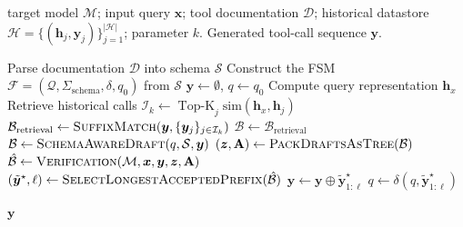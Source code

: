 \begin{algorithm}[tb]
\caption{Tool-calling with \method}
\label{alg:toolspec}
\small
\begin{algorithmic}[1]
\Require target model $\mathcal{M}$; input query $\boldsymbol{x}$; tool documentation $\mathcal{D}$; historical datastore $\mathcal{H}=\{(\boldsymbol{h}_j,\boldsymbol{y}_j)\}_{j=1}^{|\mathcal{H}|}$; parameter $k$.
\Ensure Generated tool-call sequence $\boldsymbol{y}$.

\State Parse documentation $\mathcal{D}$ into schema $\mathcal{S}$ %
\State Construct the FSM $\mathcal{F}=(\mathcal{Q}, \Sigma_{\text{schema}}, \delta, q_0)$ from $\mathcal{S}$
\State $\boldsymbol{y} \gets \emptyset$, $q \gets q_0$
\State Compute query representation $\boldsymbol{h}_x$
\State Retrieve historical calls $\mathcal{I}_k \gets \operatorname{Top-K}_{j} \text{sim}(\boldsymbol{h}_x,\boldsymbol{h}_j)$
    \State $\mathcal{B}_{\text{retrieval}} \gets \textsc{SuffixMatch}(\boldsymbol{y}, \{{\boldsymbol{y}}_{j}\}_{j \in \mathcal{I}_k})$
        \State $\mathcal{B} \gets \mathcal{B}_{\text{retrieval}}$
    \Else
        \State $\mathcal{B} \gets 
        \textsc{SchemaAwareDraft}(q,\mathcal{S},\boldsymbol{y})$
    \EndIf
    \State $(\boldsymbol{z},\mathbf{A}) \gets \textsc{PackDraftsAsTree}(\mathcal{B})$
    \State $\hat{\mathcal{B}} \gets \textsc{Verification}(\mathcal{M}, \boldsymbol{x}, \boldsymbol{y}, \boldsymbol{z}, \mathbf{A})$
    \State $(\tilde{\boldsymbol{y}}^\star,\ell) \gets \textsc{SelectLongestAcceptedPrefix}(\hat{\mathcal{B}})$
    \State $\boldsymbol{y} \gets \boldsymbol{y} \oplus \tilde{\boldsymbol{y}}^\star_{1:\ell}$
    \State $q \gets \delta(q, \tilde{\boldsymbol{y}}^\star_{1:\ell})$
\EndWhile

\State \Return $\boldsymbol{y}$
\end{algorithmic}
\end{algorithm}